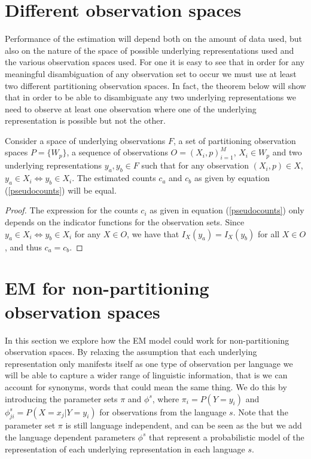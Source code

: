\section{Different observation spaces}
Performance of the estimation will depend both on the amount of data used, but also on the nature of the space of possible underlying representations used and the various observation spaces used. For one it is easy to see that in order for any meaningful disambiguation of any observation set to occur we must use at least two different partitioning observation spaces. In fact, the theorem below will show that in order to be able to disambiguate any two underlying representations we need to observe at least one observation where one of the underlying representation is possible but not the other.

\begin{theorem}
Consider a space of underlying observations $F$, a set of partitioning observation spaces $P = \{W_p\}$, a sequence of observations $O=(X_i, p)_{i=1}^M$, $X_i \in W_p$ and two underlying representations $y_a,y_b\in F$ such that for any observation $(X_i,p)\in X$, $y_a \in X_i \iff y_b \in X_i$. The estimated counts $c_a$ and $c_b$ as given by equation (\ref{pseudocounts}) will be equal.
\end{theorem}
\begin{proof}
The expression for the counts $c_i$ as given in equation (\ref{pseudocounts}) only depends on the indicator functions for the observation sets. Since $y_a \in X_i \iff y_b \in X_i$ for any $X\in O$, we have that $I_X(y_a) = I_X(y_b)$ for all $X\in O$, and thus $c_a=c_b$.
\end{proof}

\section{EM for non-partitioning observation spaces}
In this section we explore how the EM model could work for non-partitioning observation spaces. By relaxing the assumption that each underlying representation only manifests itself as one type of observation per language we will be able to capture a wider range of linguistic information, that is we can account for synonyms, words that could mean the same thing. We do this by introducing the parameter sets $\pi$ and $\phi^s$, where $\pi_i = P(Y=y_i)$ and $\phi^s_{ji} = P(X = x_j | Y=y_i)$ for observations from the language $s$. Note that the parameter set $\pi$ is still language independent, and can be seen as the  but we add the language dependent parameters $\phi^s$ that represent a probabilistic model of the representation of each underlying representation in each language $s$.

